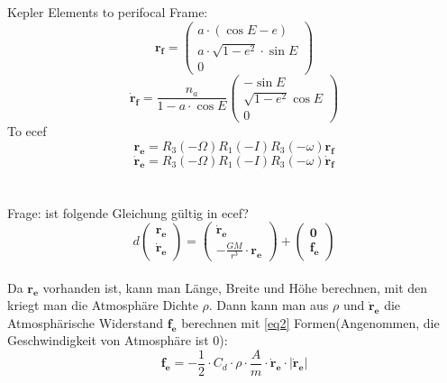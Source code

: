 \documentclass{article}
\begin{document}
\section{}
Kepler Elements to perifocal Frame: 
\begin{equation*}
	\bm{r_f} = \left(\begin{matrix}
		a \cdot \left(\cos E-e\right) \\
		a \cdot \sqrt{1-e^2} \cdot \sin E \\
		0
	\end{matrix}\right)
\end{equation*}
\begin{equation*}
	\bm{\dot{r}_f} = \frac{n_a}{1-a \cdot \cos E}\left(\begin{matrix}
		-\sin E \\
		\sqrt{1-e^2} \cos E \\
		0
	\end{matrix}\right)
\end{equation*}
To ecef
\begin{equation*}
	\bm{r_e} = R_3(-\Omega) R_1(-I) R_3(-\omega) \bm{r_f}
\end{equation*}
\begin{equation*}
	\bm{\dot{r}_e} = R_3(-\Omega) R_1(-I) R_3(-\omega) \bm{\dot{r}_f}
\end{equation*}
\\
\\
Frage: ist folgende Gleichung gültig in ecef?
\begin{equation}\label{eq1}
	d \left(\begin{matrix}
		\bm{r_e} \\
		\bm{\dot{r}_e}
	\end{matrix}\right) = \left(\begin{matrix}
	\bm{\dot{r}_e} \\
	-\frac{GM}{r^3} \cdot \bm{r_e}
\end{matrix}\right) + \left(\begin{matrix}
\bm{0} \\
\bm{f_e}
\end{matrix}\right)
\end{equation}
\\
Da $\bm{r_e}$ vorhanden ist, kann man Länge, Breite und Höhe berechnen, mit den kriegt man die Atmosphäre Dichte $\rho$. Dann kann man aus $\rho$ und $\bm{\dot{r}_e}$ die Atmosphärische Widerstand $\bm{f_e}$ berechnen mit \autoref{eq2} Formen(Angenommen, die Geschwindigkeit von Atmosphäre ist 0):
\begin{equation}\label{eq2}
	\bm{f_e} = -\frac{1}{2} \cdot C_d \cdot \rho \cdot \frac{A}{m} \cdot \bm{\dot{r}_e} \cdot |\bm{\dot{r}_e}|
\end{equation}
\end{document}

